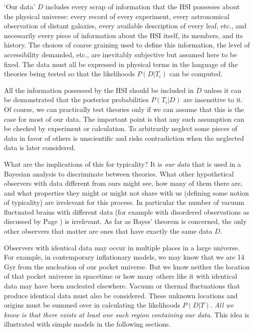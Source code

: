 \documentclass[pra,twocolumn,nofootinbib,eqsecnum,floatfix]{revtex4}
\begin{document}
 `Our data'  $D$ includes every scrap of information that the HSI possesses about the physical universe: every record of every experiment, every astronomical observation of distant galaxies, every available description of every leaf, etc., and necessarily every piece of information about the HSI itself, its members, and its history. The choices of coarse graining used to define this information, the level of accessibility demanded, etc., are inevitably subjective but assumed here to be fixed.  The data must all be expressed in physical terms in the language of the theories being tested so that the likelihoods $P(D|T_i)$ can be computed. 

All the information  possessed by the HSI should be included in $D$ unless it can be demonstrated that the posterior probabilities $P(T_i|D)$ are insensitive to it. Of course, we can practically test theories only if we can assume that this is the case for most of our data. The important point is that any such assumption can be checked by experiment or calculation. To arbitrarily neglect some pieces of data in favor of others is unscientific and risks contradiction when the neglected data is later considered. 

What are the implications of this for typicality?  It is {\it our data} that is used in a Bayesian analysis to discriminate between theories. What other hypothetical observers with data different from ours might see, how many of them there are, and what properties they might or might not share with us (defining some notion of typicality) are irrelevant for this process. In particular the number of vacuum fluctuated brains with different data (for example with disordered observations as discussed by Page \cite{Page06a, Page06b}) is irrelevant. As far as Bayes' theorem is concerned, the only other observers that matter are ones that have exactly the same data $D$.  

Observers with identical data may occur in multiple places in a large universe.  For example, in contemporary inflationary models, we may know that we are 14$\,$Gyr from the nucleation of our pocket universe. But we know neither the location of that pocket universe in spacetime or how many others like it with identical data may have been nucleated elsewhere. Vacuum or thermal fluctuations that produce identical data must also be considered. These unknown locations and origins must be summed over in calculating the likelihoods $P(D|T)$. {\it All we know is that there exists at least one such region containing our data.}  This idea is illustrated with simple models in the following sections. 
\end{document}
